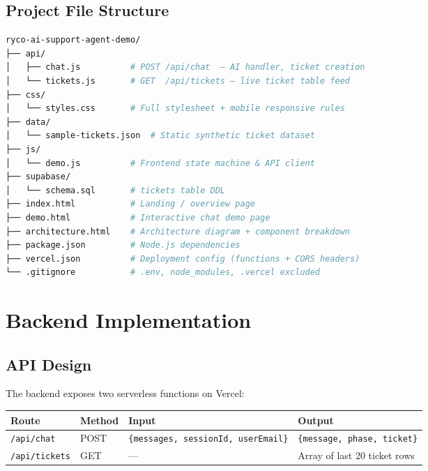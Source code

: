 \documentclass[12pt, a4paper]{article}
\begin{document}
\subsection{Project File Structure}

\begin{lstlisting}[language=bash, caption={Repository layout}]
ryco-ai-support-agent-demo/
├── api/
│   ├── chat.js          # POST /api/chat  — AI handler, ticket creation
│   └── tickets.js       # GET  /api/tickets — live ticket table feed
├── css/
│   └── styles.css       # Full stylesheet + mobile responsive rules
├── data/
│   └── sample-tickets.json  # Static synthetic ticket dataset
├── js/
│   └── demo.js          # Frontend state machine & API client
├── supabase/
│   └── schema.sql       # tickets table DDL
├── index.html           # Landing / overview page
├── demo.html            # Interactive chat demo page
├── architecture.html    # Architecture diagram + component breakdown
├── package.json         # Node.js dependencies
├── vercel.json          # Deployment config (functions + CORS headers)
└── .gitignore           # .env, node_modules, .vercel excluded
\end{lstlisting}

\section{Backend Implementation}

\subsection{API Design}

The backend exposes two serverless functions on Vercel:

\begin{center}
\begin{tabular}{llll}
\toprule
\textbf{Route} & \textbf{Method} & \textbf{Input} & \textbf{Output} \\
\midrule
\texttt{/api/chat} & POST & \texttt{\{messages, sessionId, userEmail\}} & \texttt{\{message, phase, ticket\}} \\
\texttt{/api/tickets} & GET & --- & Array of last 20 ticket rows \\
\bottomrule
\end{tabular}
\end{center}
\end{document}
